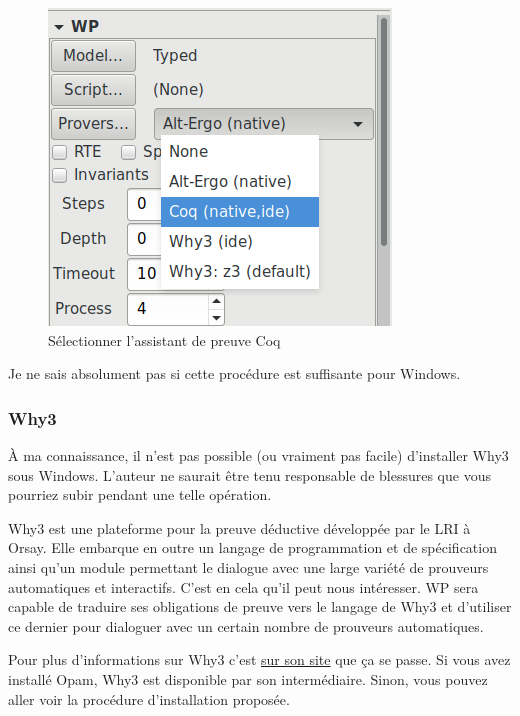 \documentclass[12pt,francais,]{scrbook}
\newenvironment{zdsalertblock}[1]{%
  \tcolorbox[beamer,%
    noparskip,breakable,
    colback=LightCoral,colframe=DarkRed,%
    colbacklower=Tomato,%
    title=#1]
}{\endtcolorbox}
\newenvironment{zdsblock}[1]{%
  \tcolorbox[beamer,%
    noparskip,breakable,
    colback=LightBlue,colframe=DarkBlue,%
    colbacklower=DarkBlue,%
    title=#1]
}{\endtcolorbox}
\begin{document}
\begin{figure}[htbp]
\centering
\includegraphics[scale=0.5]{1-2-select-coq.png}
\caption{Sélectionner l'assistant de preuve Coq}
\end{figure}

\begin{zdsblock}{Information}
  Je ne sais absolument pas si cette procédure est suffisante pour Windows.
\end{zdsblock}

\subsubsection{Why3}\label{why3}

\begin{zdsalertblock}{Attention}
  À ma connaissance, il n'est pas
  possible (ou vraiment pas facile) d'installer Why3 sous
  Windows. L'auteur ne saurait être tenu responsable de
  blessures que vous pourriez subir pendant une telle
  opération.
\end{zdsalertblock}

Why3 est une plateforme pour la preuve déductive développée par le LRI à
Orsay. Elle embarque en outre un langage de programmation et de
spécification ainsi qu'un module permettant le dialogue avec une large
variété de prouveurs automatiques et interactifs. C'est en cela qu'il
peut nous intéresser. WP sera capable de traduire ses obligations de
preuve vers le langage de Why3 et d'utiliser ce dernier pour dialoguer
avec un certain nombre de prouveurs automatiques.

Pour plus d'informations sur Why3 c'est \href{http://why3.lri.fr/}{sur
son site} que ça se passe. Si vous avez installé Opam, Why3 est
disponible par son intermédiaire. Sinon, vous pouvez aller voir la
procédure d'installation proposée.
\end{document}
